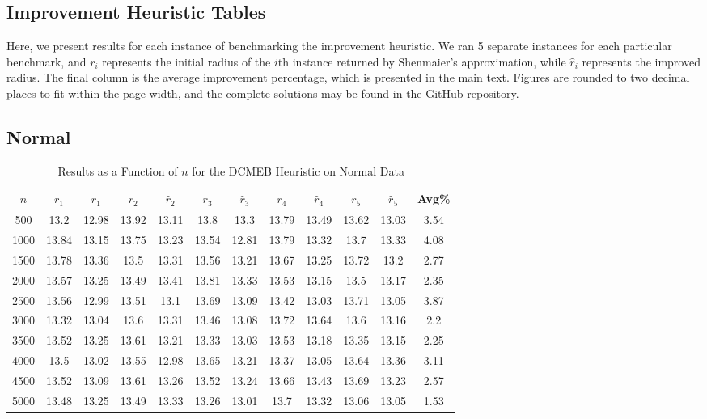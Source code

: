 \documentclass[11pt,twoside]{report}
\theoremstyle{definition}
\numberwithin{theorem}{section}
\numberwithin{definition}{section}
\numberwithin{lemma}{section}
\numberwithin{proposition}{section}
\numberwithin{equation}{section}
\numberwithin{figure}{section}
\begin{document}
\begin{appendices}
    \clearpage
    
    \section{Improvement Heuristic Tables}\label{app:impr_tables}
    Here, we present results for each instance of benchmarking the improvement heuristic. We ran 5 separate instances for each particular benchmark, and $r_i$ represents the initial radius of the $i$th instance returned by Shenmaier's approximation, while $\hat{r}_i$ represents the improved radius. The final column is the average improvement percentage, which is presented in the main text. Figures are rounded to two decimal places to fit within the page width, and the complete solutions may be found in the GitHub repository.
    
    \subsection{Normal}
    \begin{table}[ht]
        \centering
        \begin{tabular}{|c||cc||cc||cc||cc||cc||c|} \hline
            $n$&$r_1$&$\hat{r}_1$&$r_2$&$\hat{r}_2$&$r_3$&$\hat{r}_3$&$r_4$&$\hat{r}_4$&$r_5$&$\hat{r}_5$&Avg\% \\ \hline
            500&13.2&12.98&13.92&13.11&13.8&13.3&13.79&13.49&13.62&13.03&3.54 \\
            1000&13.84&13.15&13.75&13.23&13.54&12.81&13.79&13.32&13.7&13.33&4.08 \\
            1500&13.78&13.36&13.5&13.31&13.56&13.21&13.67&13.25&13.72&13.2&2.77 \\
            2000&13.57&13.25&13.49&13.41&13.81&13.33&13.53&13.15&13.5&13.17&2.35 \\
            2500&13.56&12.99&13.51&13.1&13.69&13.09&13.42&13.03&13.71&13.05&3.87 \\
            3000&13.32&13.04&13.6&13.31&13.46&13.08&13.72&13.64&13.6&13.16&2.2 \\
            3500&13.52&13.25&13.61&13.21&13.33&13.03&13.53&13.18&13.35&13.15&2.25 \\
            4000&13.5&13.02&13.55&12.98&13.65&13.21&13.37&13.05&13.64&13.36&3.11 \\
            4500&13.52&13.09&13.61&13.26&13.52&13.24&13.66&13.43&13.69&13.23&2.57 \\
            5000&13.48&13.25&13.49&13.33&13.26&13.01&13.7&13.32&13.06&13.05&1.53 \\ \hline
        \end{tabular}
        \caption{Results as a Function of $n$ for the DCMEB Heuristic on Normal Data}
        \label{tab:normal_dcmeb_table_n}
    \end{table}
    

\end{appendices}
\end{document}
